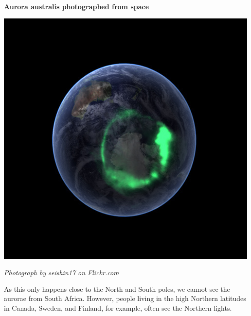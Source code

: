 \begin{minipage}{.4\textwidth}
 \begin{center}
  \textbf{Aurora australis photographed from space}\par
  \includegraphics[width=.9\textwidth]{photos/aurora_australis_seishin17.jpg}\par
  \textit{Photograph by seishin17 on Flickr.com}
 \end{center}
\end{minipage}


As this only happens close to the North and South poles, we cannot see the aurorae from South Africa. However, people living in the high Northern latitudes in Canada, Sweden, and Finland, for example, often see the Northern lights.  \\


